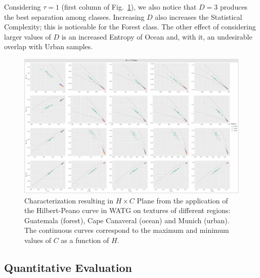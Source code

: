 \documentclass[journal]{IEEEtran}
\begin{document}
	Considering $\tau=1$ (first column of Fig.~\ref{fig:Regions}), 
	we also notice that $D=3$ produces the best separation among classes.
	Increasing $D$ also increases the Statistical Complexity; this is noticeable for the Forest class.
	The other effect of considering larger values of $D$ is an increased Entropy of Ocean and, with it, an undesirable overlap with Urban samples.
	
	
	\begin{figure}
		\centering
		\includegraphics[width=1\textwidth]{Figures/WATGHC.pdf}
		\caption{Characterization resulting in $H \times C$ Plane from the application of the Hilbert-Peano curve in WATG on textures of different regions: Guatemala (forest), Cape Canaveral (ocean) and Munich (urban). 
			The continuous curves correspond to the maximum and minimum values of $C$ as a function of $H$.}
		\label{fig:Regions}
	\end{figure}
	
	\subsection{Quantitative Evaluation}
	
\end{document}
